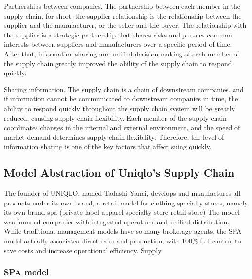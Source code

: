 \documentclass[12pt,]{article}
\begin{document}
Partnerships between companies. The partnership between each member in
the supply chain, for short, the supplier relationship is the
relationship between the supplier and the manufacturer, or the seller
and the buyer. The relationship with the supplier is a strategic
partnership that shares risks and pursues common interests between
suppliers and manufacturers over a specific period of time. After that,
information sharing and unified decision-making of each member of the
supply chain greatly improved the ability of the supply chain to respond
quickly.

Sharing information. The supply chain is a chain of downstream
companies, and if information cannot be communicated to downstream
companies in time, the ability to respond quickly throughout the supply
chain system will be greatly reduced, causing supply chain flexibility.
Each member of the supply chain coordinates changes in the internal and
external environment, and the speed of market demand determines supply
chain flexibility. Therefore, the level of information sharing is one of
the key factors that affect suing quickly.

\hypertarget{model-abstraction-of-uniqlos-supply-chain}{%
\subsection{Model Abstraction of Uniqlo's Supply
Chain}\label{model-abstraction-of-uniqlos-supply-chain}}

The founder of UNIQLO, named Tadashi Yanai, develops and manufactures
all products under its own brand, a retail model for clothing specialty
stores, namely its own brand spa (private label apparel specialty store
retail store) The model was founded companies with integrated operations
and unified distribution. While traditional management models have so
many brokerage agents, the SPA model actually associates direct sales
and production, with 100\% full control to save costs and increase
operational efficiency. Supply.

\hypertarget{spa-model}{%
\subsubsection{SPA model}\label{spa-model}}
\end{document}
